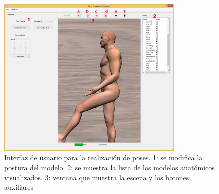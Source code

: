 \begin{figure}
    \centering
    \includegraphics[width=0.8\textwidth]{IMG/posingui.png}
    \caption{Interfaz de usuario para la realización de poses. 1: se modifica la postura del modelo. 2: se muestra la lista de los modelos anatómicos visualizados. 3: ventana que muestra la escena y  los botones auxiliares}
    \label{fig:posui}
\end{figure}


